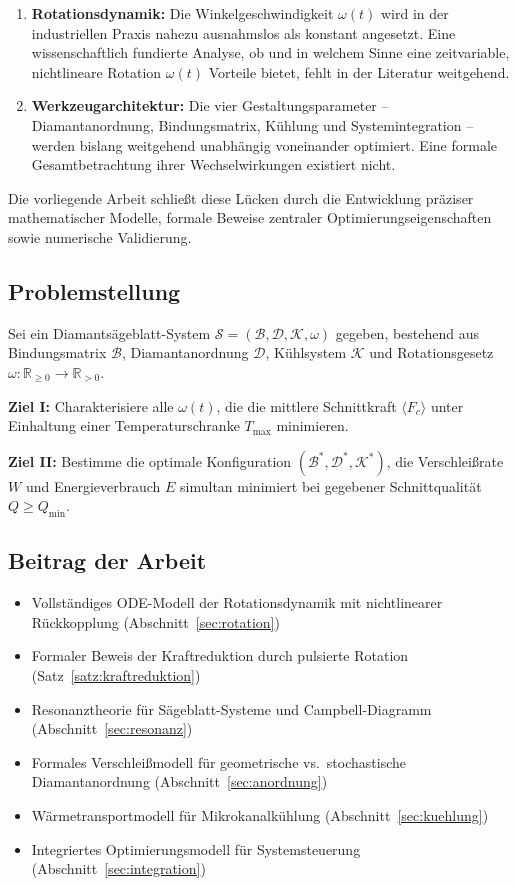 ﻿\documentclass[a4paper,12pt]{article}
\theoremstyle{definition}
\begin{document}
\begin{enumerate}
\item \textbf{Rotationsdynamik:} Die Winkelgeschwindigkeit $\omega(t)$ wird in der industriellen
      Praxis nahezu ausnahmslos als konstant angesetzt. Eine wissenschaftlich fundierte Analyse,
      ob und in welchem Sinne eine zeitvariable, nichtlineare Rotation $\omega(t)$ Vorteile
      bietet, fehlt in der Literatur weitgehend.
\item \textbf{Werkzeugarchitektur:} Die vier Gestaltungsparameter -- Diamantanordnung, Bindungsmatrix,
      Kühlung und Systemintegration -- werden bislang weitgehend unabhängig voneinander optimiert.
      Eine formale Gesamtbetrachtung ihrer Wechselwirkungen existiert nicht.
\end{enumerate}

Die vorliegende Arbeit schließt diese Lücken durch die Entwicklung präziser mathematischer Modelle,
formale Beweise zentraler Optimierungseigenschaften sowie numerische Validierung.

\subsection{Problemstellung}

Sei ein Diamantsägeblatt-System $\mathcal{S} = (\mathcal{B}, \mathcal{D}, \mathcal{K}, \omega)$
gegeben, bestehend aus Bindungsmatrix $\mathcal{B}$, Diamantanordnung $\mathcal{D}$,
Kühlsystem $\mathcal{K}$ und Rotationsgesetz $\omega: \mathbb{R}_{\geq 0} \to \mathbb{R}_{>0}$.

\textbf{Ziel I:} Charakterisiere alle $\omega(t)$, die die mittlere Schnittkraft $\langle F_c \rangle$
unter Einhaltung einer Temperaturschranke $T_{\max}$ minimieren.

\textbf{Ziel II:} Bestimme die optimale Konfiguration $(\mathcal{B}^*, \mathcal{D}^*, \mathcal{K}^*)$,
die Verschleißrate $W$ und Energieverbrauch $E$ simultan minimiert bei gegebener Schnittqualität $Q \geq Q_{\min}$.

\subsection{Beitrag der Arbeit}

\begin{itemize}
\item Vollständiges ODE-Modell der Rotationsdynamik mit nichtlinearer Rückkopplung (Abschnitt~\ref{sec:rotation})
\item Formaler Beweis der Kraftreduktion durch pulsierte Rotation (Satz~\ref{satz:kraftreduktion})
\item Resonanztheorie für Sägeblatt-Systeme und Campbell-Diagramm (Abschnitt~\ref{sec:resonanz})
\item Formales Verschleißmodell für geometrische vs.\ stochastische Diamantanordnung (Abschnitt~\ref{sec:anordnung})
\item Wärmetransportmodell für Mikrokanalkühlung (Abschnitt~\ref{sec:kuehlung})
\item Integriertes Optimierungsmodell für Systemsteuerung (Abschnitt~\ref{sec:integration})
\end{itemize}
\end{document}
